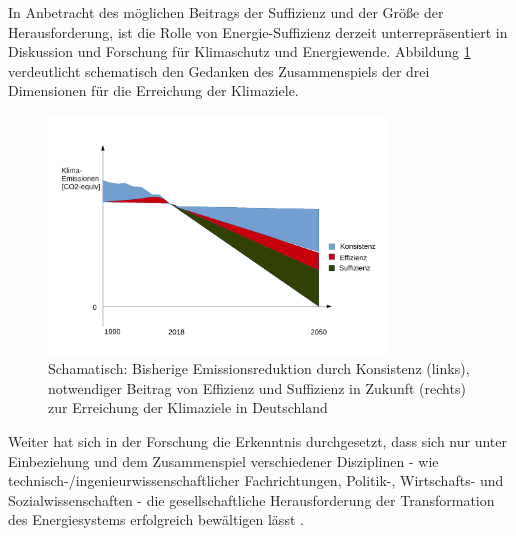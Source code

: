 \documentclass[a4paper,11pt,twoside]{scrartcl}
\begin{document}
In Anbetracht des möglichen Beitrags der Suffizienz und der Größe der Herausforderung, ist die Rolle von Energie-Suffizienz derzeit unterrepräsentiert in Diskussion und Forschung für Klimaschutz und Energiewende. Abbildung \ref{fig:zusammenspiel} verdeutlicht schematisch den Gedanken des Zusammenspiels der drei Dimensionen für die Erreichung der Klimaziele. 


\begin{figure}[!h]
    \centering
    \includegraphics[width=0.8\textwidth]{figures/Zusammenspiel2.pdf}
    \caption{Schamatisch: Bisherige Emissionsreduktion durch Konsistenz (links), notwendiger Beitrag von Effizienz und Suffizienz in Zukunft (rechts) zur Erreichung der Klimaziele in Deutschland}
    \label{fig:zusammenspiel}
\end{figure}

Weiter hat sich in der Forschung die Erkenntnis durchgesetzt, dass sich nur unter Einbeziehung und dem Zusammenspiel verschiedener Disziplinen - wie technisch-/ingenieurwissenschaftlicher Fachrichtungen, Politik-, Wirtschafts- und Sozialwissenschaften - die gesellschaftliche Herausforderung der Transformation des Energiesystems erfolgreich bewältigen lässt \cite{WGBU2012}.
\end{document}
